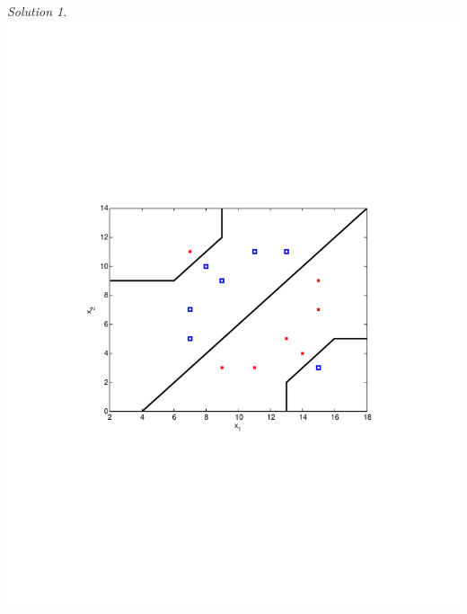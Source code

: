 \documentclass[a4paper,twoside=false,abstract=false,numbers=noenddot,
titlepage=false,headings=small,parskip=half,version=last]{scrartcl}
\theoremstyle{definition}
\theoremstyle{remark}
\newtheorem*{solution}{Solution}
\begin{document}
\begin{solution}
\includegraphics{excercise2.pdf}

\end{solution}
\end{document}

